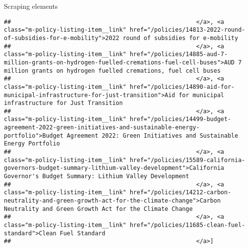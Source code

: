 \documentclass[
  10pt,
  ignorenonframetext,
  aspectratio=169]{beamer}
\begin{document}
\begin{frame}[fragile]{Scraping elements}
\begin{verbatim}
##                                                     </a>, <a class="m-policy-listing-item__link" href="/policies/14813-2022-round-of-subsidies-for-e-mobility">2022 round of subsidies for e-mobility
##                                                     </a>, <a class="m-policy-listing-item__link" href="/policies/14885-aud-7-million-grants-on-hydrogen-fuelled-cremations-fuel-cell-buses">AUD 7 million grants on hydrogen fuelled cremations, fuel cell buses
##                                                     </a>, <a class="m-policy-listing-item__link" href="/policies/14890-aid-for-municipal-infrastructure-for-just-transition">Aid for municipal infrastructure for Just Transition
##                                                     </a>, <a class="m-policy-listing-item__link" href="/policies/14499-budget-agreement-2022-green-initiatives-and-sustainable-energy-portfolio">Budget Agreement 2022: Green Initiatives and Sustainable Energy Portfolio
##                                                     </a>, <a class="m-policy-listing-item__link" href="/policies/15589-california-governors-budget-summary-lithium-valley-development">California Governor's Budget Summary: Lithium Valley Development
##                                                     </a>, <a class="m-policy-listing-item__link" href="/policies/14212-carbon-neutrality-and-green-growth-act-for-the-climate-change">Carbon Neutrality and Green Growth Act for the Climate Change
##                                                     </a>, <a class="m-policy-listing-item__link" href="/policies/11685-clean-fuel-standard">Clean Fuel Standard
##                                                     </a>]
\end{verbatim}
\end{frame}
\end{document}
